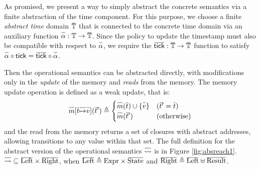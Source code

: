 \documentclass{article}
\theoremstyle{definition}
\def\ovbarw{1.2mu}
\def\ovbarh{1}
\newcommand*{\ovbar}[1]{\mkern \ovbarw\overline{\mkern-\ovbarw{\smash{#1}\scalebox{1}[\ovbarh]{\vphantom{i}}}\mkern-\ovbarw}\mkern \ovbarw}
\newcommand*{\A}[1]{\ovbar{#1}}
\newcommand*{\Expr}{\text{Expr}}
\newcommand*{\Time}{\mathbb{T}}
\newcommand*{\Left}{\text{Left}}
\newcommand*{\Right}{\text{Right}}
\newcommand*{\mem}{m}
\newcommand*{\State}{\text{State}}
\newcommand*{\Result}{\text{Result}}
\newcommand*{\semarrow}{\rightsquigarrow}
\newcommand*{\tick}{\mathsf{tick}}
\begin{document}
As promised, we present a way to simply abstract the concrete semantics via a finite abstraction of the time component.
For this purpose, we choose a finite \emph{abstract time} domain $\A\Time$ that is connected to the concrete time domain via an auxiliary function $\A\alpha:\Time\rightarrow\A\Time$.
Since the policy to update the timestamp must also be compatible with respect to $\A\alpha$, we require the $\A\tick:\A\Time\rightarrow\A\Time$ function to satisfy $\A\alpha\circ\tick=\A\tick\circ\A\alpha$.

Then the operational semantics can be abstracted directly, with modifications only in the \emph{update} of the memory and \emph{reads} from the memory.
The memory update operation is defined as a weak update, that is:
\[
  \A{\mem}[\A{t}\A{\mapsto}\A{v}](\A{t'})\triangleq
  \begin{cases}
    \A{\mem}(\A{t})\cup\{\A{v}\} & (\A{t'}=\A{t})     \\
    \A{\mem}(\A{t'})             & (\text{otherwise})
  \end{cases}
\]
and the read from the memory returns a set of closures with abstract addresses, allowing transitions to any value within that set.
The full definition for the abstract version of the operational semantics $\A\semarrow$ is in Figure \ref{fig:absreach1}.
$\A\semarrow\subseteq\A\Left\times\A\Right$, when $\A\Left\triangleq\Expr\times\A\State$ and $\A\Right\triangleq\A\Left\uplus\A\Result$.
\end{document}
